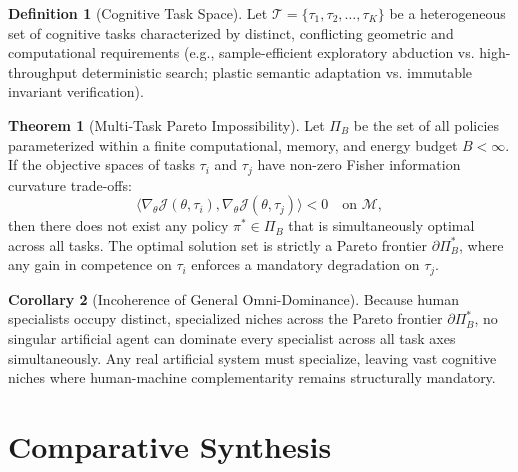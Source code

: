 \documentclass[11pt,a4paper]{article}
\theoremstyle{definition}
\newtheorem{definition}{Definition}[section]
\newtheorem{theorem}{Theorem}[section]
\newtheorem{corollary}[theorem]{Corollary}
\begin{document}
\begin{definition}[Cognitive Task Space]
Let $\mathcal{T} = \{\tau_1, \tau_2, \dots, \tau_K\}$ be a heterogeneous set of cognitive tasks characterized by distinct, conflicting geometric and computational requirements (e.g., sample-efficient exploratory abduction vs. high-throughput deterministic search; plastic semantic adaptation vs. immutable invariant verification).
\end{definition}

\begin{theorem}[Multi-Task Pareto Impossibility]
Let $\Pi_B$ be the set of all policies parameterized within a finite computational, memory, and energy budget $B < \infty$. If the objective spaces of tasks $\tau_i$ and $\tau_j$ have non-zero Fisher information curvature trade-offs:
\begin{equation}
    \langle \nabla_\theta \mathcal{J}(\theta, \tau_i), \nabla_\theta \mathcal{J}(\theta, \tau_j) \rangle < 0 \quad \text{on } \mathcal{M},
\end{equation}
then there does not exist any policy $\pi^* \in \Pi_B$ that is simultaneously optimal across all tasks. The optimal solution set is strictly a Pareto frontier $\partial \Pi_B^*$, where any gain in competence on $\tau_i$ enforces a mandatory degradation on $\tau_j$.
\end{theorem}

\begin{corollary}[Incoherence of General Omni-Dominance]
Because human specialists occupy distinct, specialized niches across the Pareto frontier $\partial \Pi_B^*$, no singular artificial agent can dominate every specialist across all task axes simultaneously. Any real artificial system must specialize, leaving vast cognitive niches where human-machine complementarity remains structurally mandatory.
\end{corollary}

\section{Comparative Synthesis}
\end{document}
